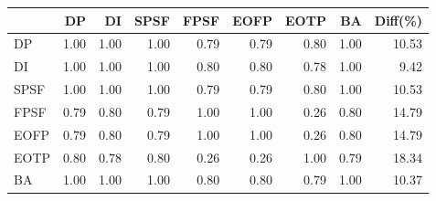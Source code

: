 \begin{tabular}{l|rrrrrrr|r}
\toprule
 & DP & DI & SPSF & FPSF & EOFP & EOTP & BA & Diff(\%)  \\
\midrule
DP & 1.00 & 1.00 & 1.00 & 0.79 & 0.79 & 0.80 & 1.00 & 10.53  \\
DI & 1.00 & 1.00 & 1.00 & 0.80 & 0.80 & 0.78 & 1.00 & 9.42  \\
SPSF & 1.00 & 1.00 & 1.00 & 0.79 & 0.79 & 0.80 & 1.00 & 10.53  \\
FPSF & 0.79 & 0.80 & 0.79 & 1.00 & 1.00 & 0.26 & 0.80 & 14.79  \\
EOFP & 0.79 & 0.80 & 0.79 & 1.00 & 1.00 & 0.26 & 0.80 & 14.79  \\
EOTP & 0.80 & 0.78 & 0.80 & 0.26 & 0.26 & 1.00 & 0.79 & 18.34  \\
BA & 1.00 & 1.00 & 1.00 & 0.80 & 0.80 & 0.79 & 1.00 & 10.37  \\
\bottomrule
\end{tabular}

